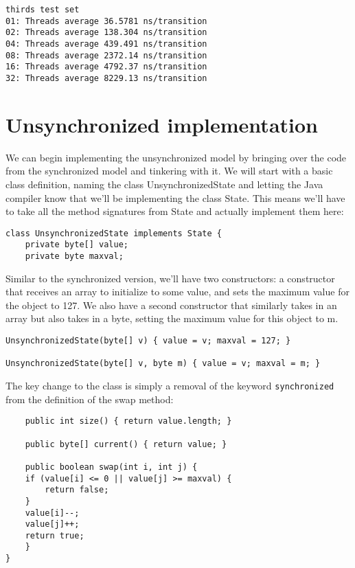 \documentclass[11pt]{article}
\begin{document}
\begin{verbatim}
thirds test set
01: Threads average 36.5781 ns/transition
02: Threads average 138.304 ns/transition
04: Threads average 439.491 ns/transition
08: Threads average 2372.14 ns/transition
16: Threads average 4792.37 ns/transition
32: Threads average 8229.13 ns/transition
\end{verbatim}

\section{Unsynchronized implementation}
\label{sec-4}
We can begin implementing the unsynchronized model by bringing over
the code from the synchronized model and tinkering with it. We will
start with a basic class definition, naming the class
UnsynchronizedState and letting the Java compiler know that we'll be
implementing the class State. This means we'll have to take all the
method signatures from State and actually implement them here:

\begin{verbatim}
class UnsynchronizedState implements State {
    private byte[] value;
    private byte maxval;
\end{verbatim}

Similar to the synchronized version, we'll have two constructors: a
constructor that receives an array to initialize to some value, and
sets the maximum value for the object to 127. We also have a second
constructor that similarly takes in an array but also takes in a
byte, setting the maximum value for this object to m.

\begin{verbatim}
UnsynchronizedState(byte[] v) { value = v; maxval = 127; }

UnsynchronizedState(byte[] v, byte m) { value = v; maxval = m; }
\end{verbatim}

The key change to the class is simply a removal of the keyword
\verb~synchronized~ from the definition of the swap method:

\begin{verbatim}
    public int size() { return value.length; }

    public byte[] current() { return value; }

    public boolean swap(int i, int j) {
	if (value[i] <= 0 || value[j] >= maxval) {
	    return false;
	}
	value[i]--;
	value[j]++;
	return true;
    }
}
\end{verbatim}
\end{document}
